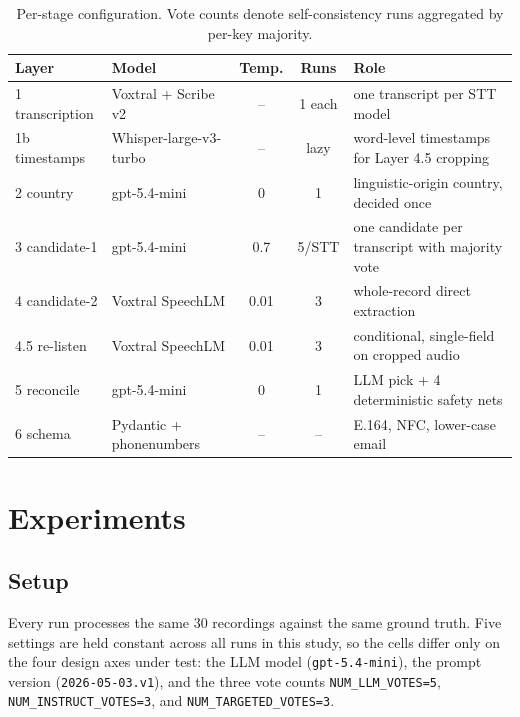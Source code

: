 \documentclass[11pt,a4paper]{article}
\begin{document}
\begin{table}[h]
\centering
\caption{Per-stage configuration. Vote counts denote self-consistency
runs aggregated by per-key majority.}
\label{tab:layers}
\small
\begin{tabularx}{\linewidth}{l l c c X}
\toprule
\textbf{Layer} & \textbf{Model} & \textbf{Temp.} & \textbf{Runs} & \textbf{Role}\\
\midrule
1 transcription   & Voxtral + Scribe v2     & --   & 1 each & one transcript per STT model \\
1b timestamps     & Whisper-large-v3-turbo  & --   & lazy   & word-level timestamps for Layer 4.5 cropping \\
2 country         & gpt-5.4-mini            & 0    & 1      & linguistic-origin country, decided once \\
3 candidate-1     & gpt-5.4-mini            & 0.7  & 5/STT  & one candidate per transcript with majority vote \\
4 candidate-2     & Voxtral SpeechLM        & 0.01 & 3      & whole-record direct extraction \\
4.5 re-listen     & Voxtral SpeechLM        & 0.01 & 3      & conditional, single-field on cropped audio \\
5 reconcile       & gpt-5.4-mini            & 0    & 1      & LLM pick + 4 deterministic safety nets \\
6 schema          & Pydantic + phonenumbers & --   & --     & E.164, NFC, lower-case email \\
\bottomrule
\end{tabularx}
\end{table}

\section{Experiments}\label{sec:exp}

\subsection{Setup}

Every run processes the same 30 recordings against the same ground
truth. Five settings are held constant across all runs in this
study, so the cells differ only on the four design axes under test:
the LLM model (\verb|gpt-5.4-mini|), the prompt version
(\verb|2026-05-03.v1|), and the three vote counts
\verb|NUM_LLM_VOTES=5|, \verb|NUM_INSTRUCT_VOTES=3|, and
\verb|NUM_TARGETED_VOTES=3|.
\end{document}
